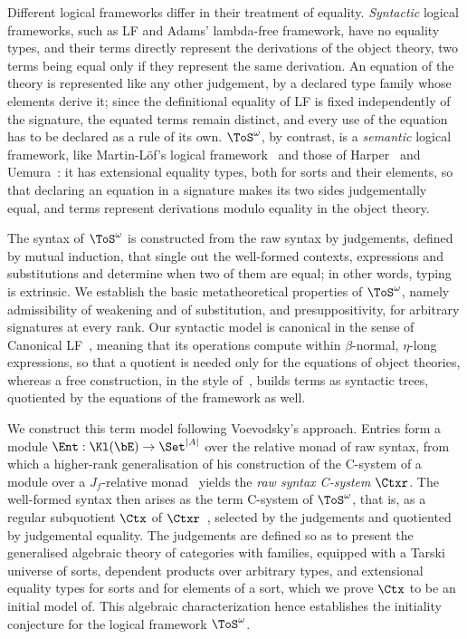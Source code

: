 Different logical frameworks differ in their treatment of equality. \emph{Syntactic} logical frameworks, such as LF and Adams' lambda-free framework, have no equality types, and their terms directly represent the derivations of the object theory, two terms being equal only if they represent the same derivation. An equation of the theory is represented like any other judgement, by a declared type family whose elements derive it; since the definitional equality of LF is fixed independently of the signature, the equated terms remain distinct, and every use of the equation has to be declared as a rule of its own. $\ToS^\omega$, by contrast, is a \emph{semantic} logical framework, like Martin-L{\"o}f's logical framework~\cite{NordstromPeterssonSmith1990} and those of Harper~\cite{Harper2021} and Uemura~\cite{Uemura2023}: it has extensional equality types, both for sorts and their elements, so that declaring an equation in a signature makes its two sides judgementally equal, and terms represent derivations modulo equality in the object theory.

The syntax of $\ToS^\omega$ is constructed from the raw syntax by judgements, defined by mutual induction, that single out the well-formed contexts, expressions and substitutions and determine when two of them are equal; in other words, typing is extrinsic. We establish the basic metatheoretical properties of $\ToS^{\omega}$, namely admissibility of weakening and of substitution, and presuppositivity, for arbitrary signatures at every rank. Our syntactic model is canonical in the sense of Canonical LF~\cite{HarperLicata2007}, meaning that its operations compute within $\beta$-normal, $\eta$-long expressions, so that a quotient is needed only for the equations of object theories, whereas a free construction, in the style of~\cite{AltenkirchKaposi2016}, builds terms as syntactic trees, quotiented by the equations of the framework as well.

We construct this term model following Voevodsky's approach. Entries form a module $\Ent : \Kl(\bE) \to \Set^{\left|A\right|}$ over the relative monad of raw syntax, from which a higher-rank generalisation of his construction of the C-system of a module over a $J_f$-relative monad~\cite{Voevodsky2014Module,Voevodsky2016Relative} yields the \emph{raw syntax C-system} $\Ctxr$. The well-formed syntax then arises as the term C-system of $\ToS^\omega$, that is, as a regular subquotient $\Ctx$ of $\Ctxr$~\cite{Voevodsky2014Subsystems}, selected by the judgements and quotiented by judgemental equality. The judgements are defined so as to present the generalised algebraic theory of categories with families, equipped with a Tarski universe of sorts, dependent products over arbitrary types, and extensional equality types for sorts and for elements of a sort, which we prove $\Ctx$ to be an initial model of. This algebraic characterization hence establishes the initiality conjecture for the logical framework $\ToS^{\omega}$.

